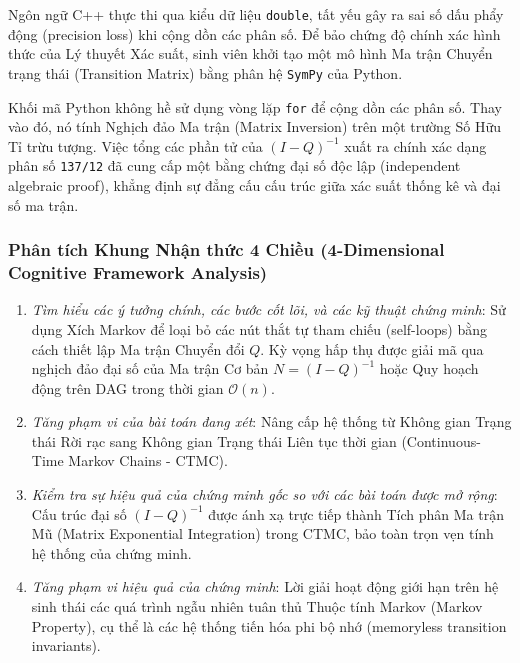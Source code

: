 \documentclass{article}
\begin{document}
Ngôn ngữ C++ thực thi qua kiểu dữ liệu \texttt{double}, tất yếu gây ra sai số dấu phẩy động (precision loss) khi cộng dồn các phân số. Để bảo chứng độ chính xác hình thức của Lý thuyết Xác suất, sinh viên khởi tạo một mô hình Ma trận Chuyển trạng thái (Transition Matrix) bằng phân hệ \texttt{\textsf{SymPy}} của Python.

Khối mã Python không hề sử dụng vòng lặp \texttt{for} để cộng dồn các phân số. Thay vào đó, nó tính Nghịch đảo Ma trận (Matrix Inversion) trên một trường Số Hữu Tỉ trừu tượng. Việc tổng các phần tử của $(I - Q)^{-1}$ xuất ra chính xác dạng phân số \texttt{137/12} đã cung cấp một bằng chứng đại số độc lập (independent algebraic proof), khẳng định sự đẳng cấu cấu trúc giữa xác suất thống kê và đại số ma trận.



\subsubsection*{Phân tích Khung Nhận thức 4 Chiều (4-Dimensional Cognitive Framework Analysis)}
\begin{enumerate}
 \item \textit{Tìm hiểu các ý tưởng chính, các bước cốt lõi, và các kỹ thuật chứng minh}: Sử dụng Xích Markov để loại bỏ các nút thắt tự tham chiếu (self-loops) bằng cách thiết lập Ma trận Chuyển đổi $Q$. Kỳ vọng hấp thụ được giải mã qua nghịch đảo đại số của Ma trận Cơ bản $N = (I - Q)^{-1}$ hoặc Quy hoạch động trên DAG trong thời gian $\mathcal{O}(n)$.
 \item \textit{Tăng phạm vi của bài toán đang xét}: Nâng cấp hệ thống từ Không gian Trạng thái Rời rạc sang Không gian Trạng thái Liên tục thời gian (Continuous-Time Markov Chains - CTMC).
 
  \item \textit{Kiểm tra sự hiệu quả của chứng minh gốc so với các bài toán được mở rộng}: Cấu trúc đại số $(I - Q)^{-1}$ được ánh xạ trực tiếp thành Tích phân Ma trận Mũ (Matrix Exponential Integration) trong CTMC, bảo toàn trọn vẹn tính hệ thống của chứng minh.
 \item \textit{Tăng phạm vi hiệu quả của chứng minh}: Lời giải hoạt động giới hạn trên hệ sinh thái các quá trình ngẫu nhiên tuân thủ Thuộc tính Markov (Markov Property), cụ thể là các hệ thống tiến hóa phi bộ nhớ (memoryless transition invariants).
\end{enumerate}
\end{document}
